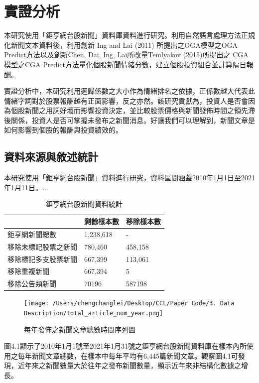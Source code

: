 \chapter{實證分析}
\label{c:implement}
本研究使用「鉅亨網台股新聞」資料庫資料進行研究。利用自然語言處理方法正規化新聞文本資料後，利用創新 Ing and Lai (2011) 所提出之OGA模型之OGA Predict方法以及創新Chen, Dai, Ing, Lai所改量Temlyakov (2015)所提出之 CGA 模型之CGA Predict方法量化個股新聞情緒分數，建立個股投資組合並計算隔日報酬。

實證分析中，本研究利用迴歸係數之大小作為情緒排名之依據，正係數越大代表此情緒字詞對於股票報酬越有正面影響，反之亦然。該研究貢獻為，投資人是否會因為個股新聞之用詞好壞而影響投資決定，並比較股票價格與新聞發佈時間之領先滯後關係，投資人是否可掌握未發布之新聞消息。好讓我們可以理解到，新聞文章是如何影響到個股的報酬與投資績效的。
\section{資料來源與敘述統計}
本研究使用「鉅亨網台股新聞」資料進行研究，資料區間涵蓋2010年1月1日至2021年1月11日。$\ldots$
\begin{table}[H]
\begin{center}
\begin{tabular}[c]{lm{5cm}<{\centering}m{5cm}<{\centering}}
\toprule
& 剩餘樣本數 & 移除樣本數\\
\hline
鉅亨網新聞總數 & 1,238,618 & - \\
移除未標記股票之新聞 & 780,460 & 458,158 \\
移除標記多支股票新聞 & 667,399 & 113,061 \\
移除重複新聞 & 667,394 & 5 \\
移除公告類新聞 & 70196 & 587198\\
\bottomrule
\end{tabular}
\end{center}
\caption{鉅亨網台股新聞資料統計}
\label{Tab 4.1}
\end{table}

\newpage

\begin{figure}[htbp]
\centering
\texttt{[image: /Users/chengchanglei/Desktop/CCL/Paper Code/3. Data Description/total\_article\_num\_year.png]}
\caption{每年發佈之新聞文章總數時間序列圖}
\end{figure}
圖4.1顯示了2010年1月1號至2021年1月31號之鉅亨網台股新聞資料庫在樣本內所使用之每年新聞文章總數，在樣本中每年平均有6,445篇新聞文章。觀察圖4.1可發現，近年來之新聞數量大於往年之發布新聞數量，顯示近年來非結構化數據之增長。

